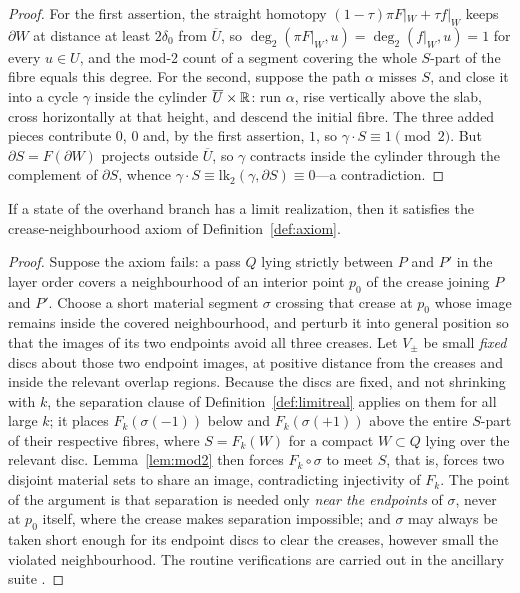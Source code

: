 \begin{proof}
For the first assertion, the straight homotopy $(1-\tau)\pi F|_W+\tau f|_W$ keeps $\partial W$ at distance at least $2\delta_0$ from $\overline U$, so $\deg_2(\pi F|_W,u)=\deg_2(f|_W,u)=1$ for every $u\in U$, and the mod-2 count of a segment covering the whole $S$-part of the fibre equals this degree. For the second, suppose the path $\alpha$ misses $S$, and close it into a cycle $\gamma$ inside the cylinder $\overline U\times\mathbb{R}$: run $\alpha$, rise vertically above the slab, cross horizontally at that height, and descend the initial fibre. The three added pieces contribute $0$, $0$ and, by the first assertion, $1$, so $\gamma\cdot S\equiv1\pmod2$. But $\partial S=F(\partial W)$ projects outside $\overline U$, so $\gamma$ contracts inside the cylinder through the complement of $\partial S$, whence $\gamma\cdot S\equiv\mathrm{lk}_2(\gamma,\partial S)\equiv0$---a contradiction.
\end{proof}

\begin{theorem}[Necessity]\label{thm:necessity}
If a state of the overhand branch has a limit realization, then it satisfies the crease-neighbourhood axiom of Definition~\textup{\ref{def:axiom}}.
\end{theorem}

\begin{proof}
Suppose the axiom fails: a pass $Q$ lying strictly between $P$ and $P'$ in the layer order covers a neighbourhood of an interior point $p_0$ of the crease joining $P$ and $P'$. Choose a short material segment $\sigma$ crossing that crease at $p_0$ whose image remains inside the covered neighbourhood, and perturb it into general position so that the images of its two endpoints avoid all three creases. Let $V_\pm$ be small \emph{fixed} discs about those two endpoint images, at positive distance from the creases and inside the relevant overlap regions. Because the discs are fixed, and not shrinking with $k$, the separation clause of Definition~\ref{def:limitreal} applies on them for all large $k$; it places $F_k(\sigma(-1))$ below and $F_k(\sigma(+1))$ above the entire $S$-part of their respective fibres, where $S=F_k(W)$ for a compact $W\subset Q$ lying over the relevant disc. Lemma~\ref{lem:mod2} then forces $F_k\circ\sigma$ to meet $S$, that is, forces two disjoint material sets to share an image, contradicting injectivity of $F_k$. The point of the argument is that separation is needed only \emph{near the endpoints} of $\sigma$, never at $p_0$ itself, where the crease makes separation impossible; and $\sigma$ may always be taken short enough for its endpoint discs to clear the creases, however small the violated neighbourhood. The routine verifications are carried out in the ancillary suite \cite{anc}.
\end{proof}


